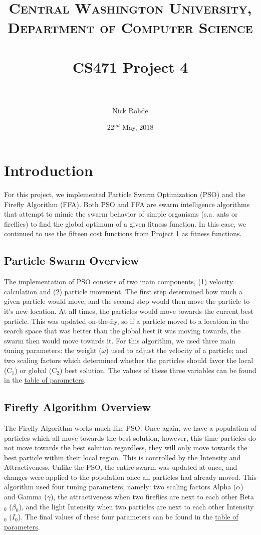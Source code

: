 \documentclass[paper=a4, fontsize=11pt]{scrartcl} %
\title{	
\normalfont \normalsize 
\textsc{Central Washington University, Department of Computer Science} \\ [25pt] %
\horrule{0.5pt} \\[0.4cm] %
\huge CS471 Project 4 \\ %
\horrule{2pt} \\[0.5cm] %
}
\author{Nick Rohde} %
\date{\normalsize 22$^{nd}$ May, 2018} %
\numberwithin{equation}{section} %
\numberwithin{figure}{section} %
\numberwithin{table}{section} %
\begin{document}
\maketitle %


\section{Introduction}\label{S1}
	For this project, we implemented Particle Swarm Optimization (PSO) and the Firefly Algorithm (FFA). Both PSO and FFA are swarm intelligence algorithms that attempt to mimic the swarm behavior of simple organisms (s.a. ants or fireflies) to find the global optimum of a given fitness function. In this case, we continued to use the fifteen cost functions from Project 1 as fitness functions. \\
	
	\subsection{Particle Swarm Overview}\label{S11}
		The implementation of PSO consists of two main components, (1) velocity calculation and (2) particle movement. The first step determined how much a given particle would move, and the second step would then move the particle to it's new location. At all times, the particles would move towards the current best particle. This was updated on-the-fly, so if a particle moved to a location in the search space that was better than the global best it was moving towards, the swarm then would move towards it. For this algorithm, we used three main tuning parameters: the weight ($\omega$) used to adjust the velocity of a particle; and two scaling factors which determined whether the particles should favor the local (C$_1$) or global (C$_2$) best solution. The values of these three variables can be found in the \hyperref[T21]{table of parameters}.
		
	
	\subsection{Firefly Algorithm Overview}\label{S12}
		The Firefly Algorithm works much like PSO. Once again, we have a population of particles which all move towards the best solution, however, this time particles do not move towards the best solution regardless, they will only move towards the best particle within their local region. This is controlled by the Intensity and Attractiveness. Unlike the PSO, the entire swarm was updated at once, and changes were applied to the population once all particles had already moved. This algorithm used four tuning parameters, namely: two scaling factors Alpha ($\alpha$) and Gamma ($\gamma$), the attractiveness when two fireflies are next to each other Beta$_0$ ($\beta_0$), and the light Intensity when two particles are next to each other Intensity$_0$ ($I_0$). The final values of these four parameters can be found in the \hyperref[T21]{table of parameters}.
			
\end{document}
